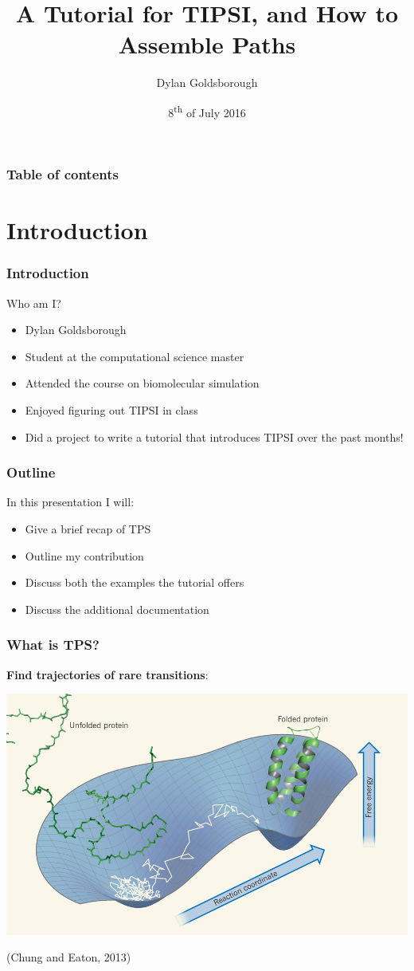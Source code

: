 \documentclass[hyperref={pdfpagelabels=false}]{beamer}
\title{A Tutorial for \textsc{TIPSI}, and How to Assemble Paths}
\author{Dylan Goldsborough}
\date{8\textsuperscript{th} of July 2016}
\begin{document}
\begin{frame}
\titlepage
\end{frame} 

\begin{frame}
\frametitle{Table of contents}
\tableofcontents
\end{frame} 


\section{Introduction} 
\setcounter{subsection}{1}
\begin{frame}
\frametitle{Introduction}
Who am I?
\begin{itemize}
\item Dylan Goldsborough
\item Student at the computational science master
\item Attended the course on biomolecular simulation
\item Enjoyed figuring out \textsc{TIPSI} in class
\item Did a project to write a tutorial that introduces \textsc{TIPSI} over the past months!
\end{itemize}
\end{frame}

\begin{frame}
\frametitle{Outline}
In this presentation I will:
\begin{itemize}
\item Give a brief recap of TPS
\item Outline my contribution
\item Discuss both the examples the tutorial offers
\item Discuss the additional documentation
\end{itemize} 
\end{frame}

\begin{frame}
\frametitle{What is TPS?}
\textbf{Find trajectories of rare transitions}:
\begin{center}
\includegraphics[scale=0.3]{images/fold.png}
\end{center}
(Chung and Eaton, 2013)
\end{frame}
\end{document}
